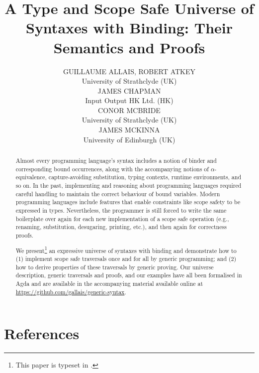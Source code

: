 \documentclass{jfp1}
\title
  [A Type and Scope Safe Universe of Syntaxes with Binding]
  {A Type and Scope Safe Universe of Syntaxes with Binding: Their Semantics and Proofs}
\author[G. Allais et al.]
  {GUILLAUME ALLAIS, ROBERT ATKEY\\
   University of Strathclyde (UK)\\
   JAMES CHAPMAN\\
   Input Output HK Ltd. (HK)\\
   CONOR MCBRIDE\\
   University of Strathclyde (UK)\\
   JAMES MCKINNA\\
   University of Edinburgh (UK)
  }
\begin{document}
\maketitle
\begin{abstract}
Almost every programming language's syntax includes a notion of binder
and corresponding bound occurrences, along with the accompanying
notions of $\alpha$-equivalence, capture-avoiding substitution, typing
contexts, runtime environments, and so on. In the past, implementing
and reasoning about programming languages required careful handling to
maintain the correct behaviour of bound variables. Modern programming
languages include features that enable constraints like scope safety
to be expressed in types. Nevertheless, the programmer is still forced
to write the same boilerplate over again for each new implementation
of a scope safe operation (e.g., renaming, substitution, desugaring,
printing, etc.), and then again for correctness proofs.

We present\footnote{This paper is typeset in .} an expressive universe of syntaxes with binding and
demonstrate how to (1) implement scope safe traversals once and for
all by generic programming; and (2) how to derive properties of these
traversals by generic proving. Our universe description, generic
traversals and proofs, and our examples have all been formalised in
Agda and are available in the accompanying material available online
at \url{https://github.com/gallais/generic-syntax}.
\end{abstract}




\renewcommand{\bibsection}{}
\section*{References}


\end{document}
